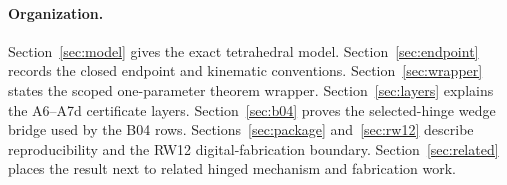 \paragraph{Organization.}
Section~\ref{sec:model} gives the exact tetrahedral model.  Section~\ref{sec:endpoint}
records the closed endpoint and kinematic conventions.  Section~\ref{sec:wrapper}
states the scoped one-parameter theorem wrapper.  Section~\ref{sec:layers}
explains the A6--A7d certificate layers.  Section~\ref{sec:b04} proves the
selected-hinge wedge bridge used by the B04 rows.  Sections~\ref{sec:package}
and~\ref{sec:rw12} describe reproducibility and the RW12 digital-fabrication
boundary.  Section~\ref{sec:related} places the result next to related hinged
mechanism and fabrication work.
